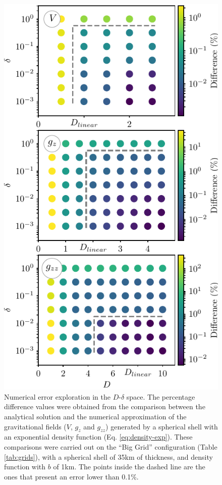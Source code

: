 \documentclass[extra]{gji}
\begin{document}
\begin{figure}
\centering
\includegraphics[width=\linewidth]
    {figures/grid-search.pdf}
\caption{
    Numerical error exploration in the $D$-$\delta$ space.
    The percentage difference values were obtained from the comparison
    between the analytical solution and the numerical approximation of
    the gravitational fields ($V$, $g_z$ and $g_{zz}$) generated by a
    spherical shell with an exponential density function (Eq. \ref{eq:density-exp}).
    These comparisons were carried out on the ``Big Grid'' configuration (Table
    \ref{tab:grids}), with a spherical shell of
    35km of thickness, and density function with $b$ of 1km.
    The points inside the dashed line are the ones that present an
    error lower than 0.1\%.
    }
\label{fig:grid-search}
\end{figure}
\end{document}
